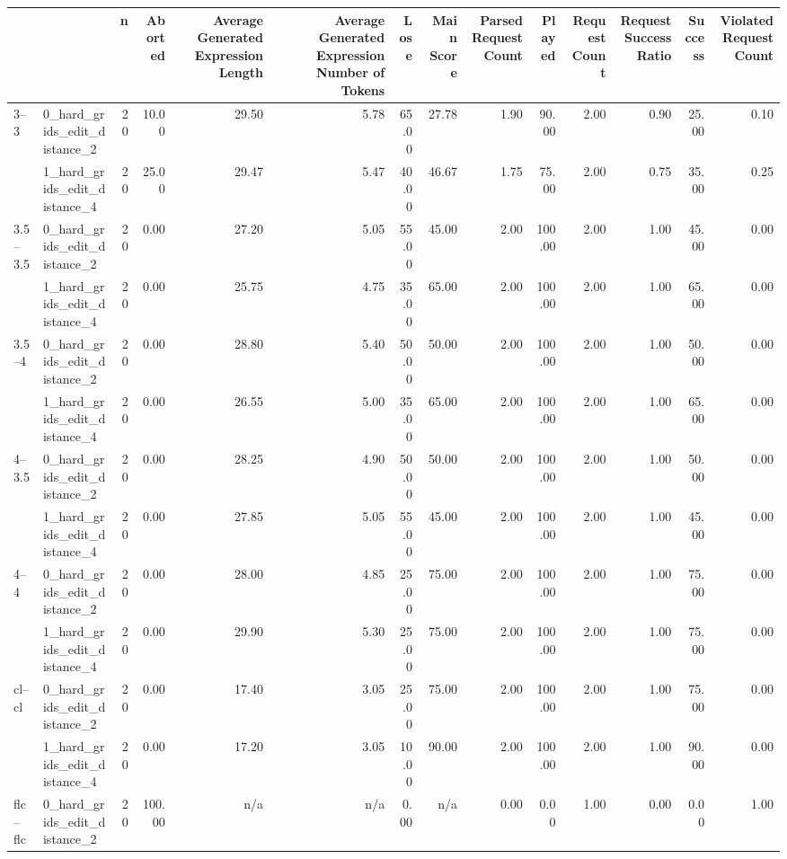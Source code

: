 \begin{tabular}{llrrrrrrrrrrrr}
\toprule
 &  & n & Aborted & Average Generated Expression Length & Average Generated Expression Number of Tokens & Lose & Main Score & Parsed Request Count & Played & Request Count & Request Success Ratio & Success & Violated Request Count \\
\midrule
\multirow[t]{2}{*}{3--3} & 0_hard_grids_edit_distance_2 & 20 & 10.00 & 29.50 & 5.78 & 65.00 & 27.78 & 1.90 & 90.00 & 2.00 & 0.90 & 25.00 & 0.10 \\
 & 1_hard_grids_edit_distance_4 & 20 & 25.00 & 29.47 & 5.47 & 40.00 & 46.67 & 1.75 & 75.00 & 2.00 & 0.75 & 35.00 & 0.25 \\
\cline{1-14}
\multirow[t]{2}{*}{3.5--3.5} & 0_hard_grids_edit_distance_2 & 20 & 0.00 & 27.20 & 5.05 & 55.00 & 45.00 & 2.00 & 100.00 & 2.00 & 1.00 & 45.00 & 0.00 \\
 & 1_hard_grids_edit_distance_4 & 20 & 0.00 & 25.75 & 4.75 & 35.00 & 65.00 & 2.00 & 100.00 & 2.00 & 1.00 & 65.00 & 0.00 \\
\cline{1-14}
\multirow[t]{2}{*}{3.5--4} & 0_hard_grids_edit_distance_2 & 20 & 0.00 & 28.80 & 5.40 & 50.00 & 50.00 & 2.00 & 100.00 & 2.00 & 1.00 & 50.00 & 0.00 \\
 & 1_hard_grids_edit_distance_4 & 20 & 0.00 & 26.55 & 5.00 & 35.00 & 65.00 & 2.00 & 100.00 & 2.00 & 1.00 & 65.00 & 0.00 \\
\cline{1-14}
\multirow[t]{2}{*}{4--3.5} & 0_hard_grids_edit_distance_2 & 20 & 0.00 & 28.25 & 4.90 & 50.00 & 50.00 & 2.00 & 100.00 & 2.00 & 1.00 & 50.00 & 0.00 \\
 & 1_hard_grids_edit_distance_4 & 20 & 0.00 & 27.85 & 5.05 & 55.00 & 45.00 & 2.00 & 100.00 & 2.00 & 1.00 & 45.00 & 0.00 \\
\cline{1-14}
\multirow[t]{2}{*}{4--4} & 0_hard_grids_edit_distance_2 & 20 & 0.00 & 28.00 & 4.85 & 25.00 & 75.00 & 2.00 & 100.00 & 2.00 & 1.00 & 75.00 & 0.00 \\
 & 1_hard_grids_edit_distance_4 & 20 & 0.00 & 29.90 & 5.30 & 25.00 & 75.00 & 2.00 & 100.00 & 2.00 & 1.00 & 75.00 & 0.00 \\
\cline{1-14}
\multirow[t]{2}{*}{cl--cl} & 0_hard_grids_edit_distance_2 & 20 & 0.00 & 17.40 & 3.05 & 25.00 & 75.00 & 2.00 & 100.00 & 2.00 & 1.00 & 75.00 & 0.00 \\
 & 1_hard_grids_edit_distance_4 & 20 & 0.00 & 17.20 & 3.05 & 10.00 & 90.00 & 2.00 & 100.00 & 2.00 & 1.00 & 90.00 & 0.00 \\
\cline{1-14}
\multirow[t]{2}{*}{flc--flc} & 0_hard_grids_edit_distance_2 & 20 & 100.00 & n/a & n/a & 0.00 & n/a & 0.00 & 0.00 & 1.00 & 0.00 & 0.00 & 1.00 \\

\end{tabular}
